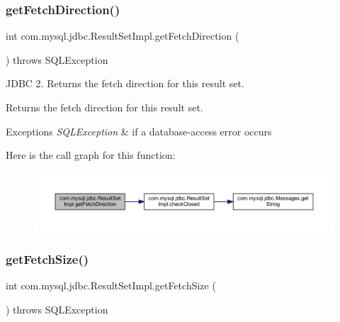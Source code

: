 \subsubsection{\texorpdfstring{get\+Fetch\+Direction()}{getFetchDirection()}}
{\footnotesize\ttfamily int com.\+mysql.\+jdbc.\+Result\+Set\+Impl.\+get\+Fetch\+Direction (\begin{DoxyParamCaption}{ }\end{DoxyParamCaption}) throws S\+Q\+L\+Exception}

J\+D\+BC 2. Returns the fetch direction for this result set.

\begin{DoxyReturn}{Returns}
the fetch direction for this result set.
\end{DoxyReturn}

\begin{DoxyExceptions}{Exceptions}
{\em S\+Q\+L\+Exception} & if a database-\/access error occurs \\
\hline
\end{DoxyExceptions}
Here is the call graph for this function\+:
\nopagebreak
\begin{figure}[H]
\begin{center}
\leavevmode
\includegraphics[width=350pt]{classcom_1_1mysql_1_1jdbc_1_1_result_set_impl_a67b150f3cdb700ccb176c37b732cab17_cgraph}
\end{center}
\end{figure}
\mbox{\label{classcom_1_1mysql_1_1jdbc_1_1_result_set_impl_a9ae5eab29975fd26c16dbbb802465632}} 
\subsubsection{\texorpdfstring{get\+Fetch\+Size()}{getFetchSize()}}
{\footnotesize\ttfamily int com.\+mysql.\+jdbc.\+Result\+Set\+Impl.\+get\+Fetch\+Size (\begin{DoxyParamCaption}{ }\end{DoxyParamCaption}) throws S\+Q\+L\+Exception}

